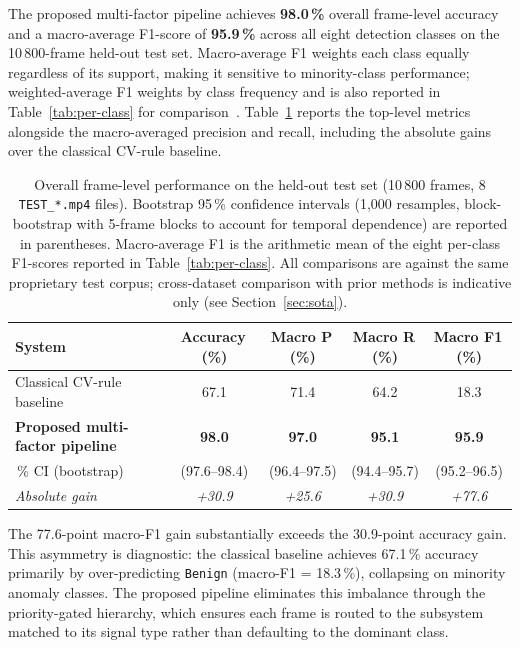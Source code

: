 \documentclass[a4paper,fleqn]{cas-dc}
\begin{document}
The proposed multi-factor pipeline achieves \textbf{98.0\,\%} overall
frame-level accuracy and a macro-average F1-score of \textbf{95.9\,\%} across
all eight detection classes on the 10\,800-frame held-out test set.
Macro-average F1 weights each class equally regardless of its support, making it sensitive to minority-class performance; weighted-average F1 weights by class frequency and is also reported in Table~\ref{tab:per-class} for comparison~\citep{manning2008introduction}.
Table~\ref{tab:overall-perf} reports the top-level metrics alongside the
macro-averaged precision and recall, including the absolute gains over the
classical CV-rule baseline.
 
\begin{table}[!ht]
\caption{Overall frame-level performance on the held-out test set
(10\,800 frames, 8 \texttt{TEST\_*.mp4} files). Bootstrap 95\,\% confidence
intervals (1{,}000 resamples, block-bootstrap with 5-frame blocks to account for
temporal dependence) are reported in parentheses. Macro-average F1 is the
arithmetic mean of the eight per-class F1-scores reported in
Table~\ref{tab:per-class}. All comparisons are against the same proprietary
test corpus; cross-dataset comparison with prior methods is indicative only
(see Section~\ref{sec:sota}).}
\label{tab:overall-perf}
\centering\small\setlength{\tabcolsep}{4pt}
\begin{tabularx}{\linewidth}{@{}>{\raggedright\arraybackslash}Xcccc@{}}
\toprule
\textbf{System} & \textbf{Accuracy\,(\%)} & \textbf{Macro P\,(\%)} &
\textbf{Macro R\,(\%)} & \textbf{Macro F1\,(\%)} \\
\midrule
Classical CV-rule baseline            & 67.1 & 71.4 & 64.2 & 18.3 \\
\textbf{Proposed multi-factor pipeline} & \textbf{98.0} & \textbf{97.0} &
\textbf{95.1} & \textbf{95.9} \\
\quad 95\,\% CI (bootstrap)           & (97.6--98.4) & (96.4--97.5) & (94.4--95.7) & (95.2--96.5) \\
\midrule
\textit{Absolute gain}                & \textit{+30.9} & \textit{+25.6} &
\textit{+30.9} & \textit{+77.6} \\
\bottomrule
\end{tabularx}
\end{table}
 
The 77.6-point macro-F1 gain substantially exceeds the 30.9-point accuracy gain. This asymmetry is diagnostic: the classical baseline achieves 67.1\,\% accuracy primarily by over-predicting \texttt{Benign} (macro-F1 = 18.3\,\%), collapsing on minority anomaly classes. The proposed pipeline eliminates this imbalance through the priority-gated hierarchy, which ensures each frame is routed to the subsystem matched to its signal type rather than defaulting to the dominant class.
 
\end{document}

